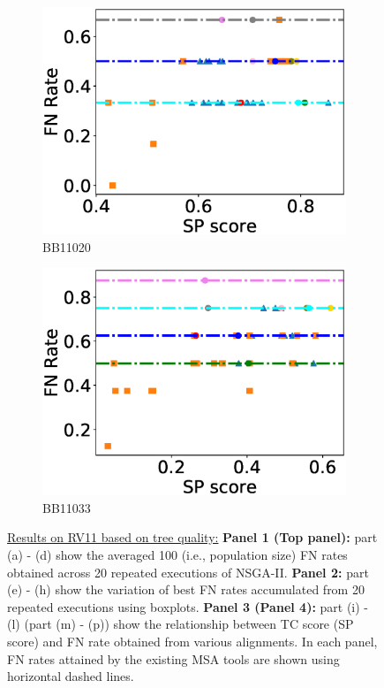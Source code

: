 \begin{figure}[!htbp]
\begin{adjustwidth}{-1cm}{-1cm}
\begin{subfigure}{0.26\textwidth}
			\includegraphics[width=\columnwidth]{Figure/summary/precomputedInit/Balibase/BB11020_fnrate_vs_sp_2}
			\caption{BB11020}
\end{subfigure}
		\begin{subfigure}{0.26\textwidth}
			\includegraphics[width=\columnwidth]{Figure/summary/precomputedInit/Balibase/BB11033_fnrate_vs_sp_2}
			\caption{BB11033}
\end{subfigure}
	
	\caption[Results on RV11 based on tree quality]{ \underline{Results on RV11 based on tree quality:} \textbf{Panel 1 (Top panel):} part (a) - (d) show the averaged 100 (i.e., population size) FN rates obtained across 20 repeated executions of NSGA-II. 
\textbf{Panel 2:} part (e) - (h) show the variation of best FN rates accumulated from 20 repeated executions using boxplots. 
	\textbf{Panel 3 (Panel 4):} part (i) - (l) (part (m) - (p)) show the relationship between TC score (SP score) and FN rate obtained from various alignments. In each panel, FN rates attained by the existing MSA tools are shown using horizontal dashed lines.}
	\label{fig:rv11_fn_rate_tc_sp}
\end{adjustwidth}
\end{figure}


